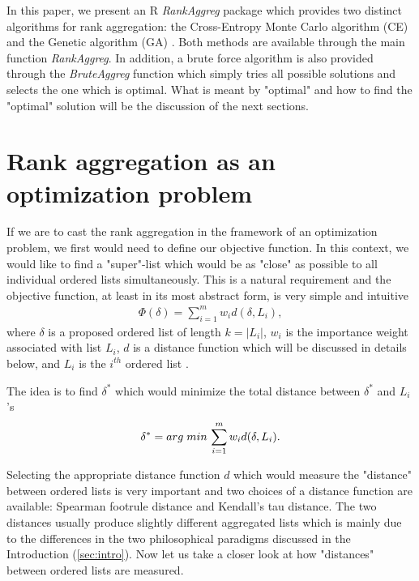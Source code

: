 \documentclass[11pt]{article}
\begin{document}
In this paper, we present an R \emph{RankAggreg} package which provides 
two distinct algorithms for rank aggregation: the Cross-Entropy Monte Carlo algorithm (CE) 
\cite{Rub99, Deb05} and the Genetic algorithm (GA) \cite{Gol89}. 
Both methods are available through the main function \emph{RankAggreg}. In addition, 
a brute force algorithm is also provided through the \emph{BruteAggreg} function which simply tries all possible
solutions and selects the one which is optimal. What is meant by "optimal" and how to find the "optimal" solution will
be the discussion of the next sections.

\section{Rank aggregation as an optimization problem}
If we are to cast the rank aggregation in the framework of an optimization problem, we first would need to define our
objective function. In this context, we would like to find a "super"-list which would be as "close" as possible to all individual 
ordered lists simultaneously. This is a natural requirement and the objective function, at least in its most abstract form, is very simple and intuitive
\begin{eqnarray*}
\Phi(\delta) = \sum_{i=1}^m w_id(\delta, L_i),
\end{eqnarray*}
where $\delta$ is a proposed ordered list of length $k=|L_i|$, $w_i$ is the importance weight associated with list $L_i$, $d$ is a distance function which will be discussed in details
below, and $L_i$ is the $i^{th}$ ordered list \cite{Pih07}. 

The idea is to find $\delta^*$ which would minimize the total distance between $\delta^*$ and $L_i$'s
\begin{eqnarray*}
\delta^*=arg \hspace{.1cm} min \, \sum_{i=1}^m w_id(\delta, L_i).
\end{eqnarray*}

Selecting the appropriate distance function $d$ which would measure the "distance" between ordered lists is very important and two choices of a
distance function are available: Spearman footrule distance and Kendall's tau distance. The two distances usually produce slightly different aggregated
lists which is mainly due to the differences in the two philosophical paradigms discussed in the Introduction (\ref{sec:intro}). Now let us take a closer look at 
how "distances" between ordered lists are measured.
\end{document}
